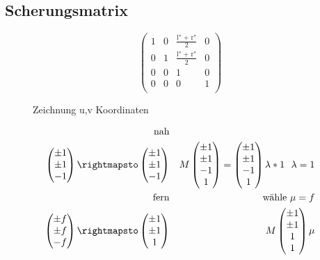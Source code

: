 \documentclass[11pt]{article}
\begin{document}
\subsection{Scherungsmatrix}
$$\begin{pmatrix}
1 & 0 & \frac{\text{l" + r"}}{2} & 0 \\
0 & 1 & \frac{\text{l" + r"}}{2} & 0 \\
0 & 0 & 1 & 0 \\
0 & 0 & 0 & 1 \\
\end{pmatrix} $$
\begin{figure}[!hb]
\begin{minipage}[l]{5cm}
{\color{red}Zeichnung u,v Koordinaten}
\end{minipage}
\hfill
\begin{minipage}[c]{6cm}
\begin{eqnarray*}
\text{nah} & & \\
\begin{pmatrix}
\pm 1 \\ \pm 1 \\ -1 
\end{pmatrix}
 \rightmapsto 
\begin{pmatrix}
\pm 1 \\ \pm 1 \\ -1 
\end{pmatrix}
& &
M 
\begin{pmatrix}
\pm 1 \\ \pm 1 \\ -1 \\ 1 \\
\end{pmatrix}
= 
\begin{pmatrix}
\pm 1 \\ \pm 1 \\ -1 \\ 1 \\
\end{pmatrix} \lambda * 1 \text{  } \,\, \lambda =1\\
\text{fern} & & \text{wähle } \mu = f\\
\begin{pmatrix}
\pm f \\ \pm f \\ -f 
\end{pmatrix}
\rightmapsto 
\begin{pmatrix}
\pm 1 \\ \pm 1 \\ 1
\end{pmatrix}
& & 
M \begin{pmatrix}
\pm 1 \\ \pm 1 \\ 1 \\ 1 
\end{pmatrix} \mu
\end{eqnarray*}
\end{minipage}
\end{figure}
\end{document}

